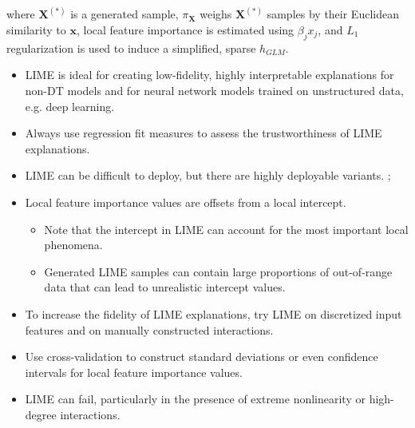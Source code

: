 \documentclass{article}
\begin{document}
where $\mathbf{X}^{(*)}$ is a generated sample, $\pi_{\mathbf{X}}$ weighs $\mathbf{X}^{(*)}$ samples by their Euclidean similarity to $\mathbf{x}$, local feature importance is estimated using $\beta_j x_j$, and $L_1$ regularization is used to induce a simplified, sparse $h_{GLM}$. 		

\begin{itemize}
	
	\item LIME is ideal for creating low-fidelity, highly interpretable explanations for non-DT models and for neural network models trained on unstructured data, e.g. deep learning.
	
	\item Always use regression fit measures to assess the trustworthiness of LIME explanations.
	
	\item LIME can be difficult to deploy, but there are highly deployable variants. \cite{lime-sup}; \cite{h2o_mli_booklet}
	
	\item Local feature importance values are offsets from a local intercept.
	
	\begin{itemize}
		
		\item Note that the intercept in LIME can account for the most important local phenomena.
		
		\item Generated LIME samples can contain large proportions of out-of-range data that can lead to unrealistic intercept values. 
		
	\end{itemize}
	
\end{itemize}

\begin{itemize}
	
	\item To increase the fidelity of LIME explanations, try LIME on discretized input features and on manually constructed interactions.
	
	\item Use cross-validation to construct standard deviations or even confidence intervals for local feature importance values.
	
	\item LIME can fail, particularly in the presence of extreme nonlinearity or high-degree interactions.
	
\end{itemize}
\end{document}
